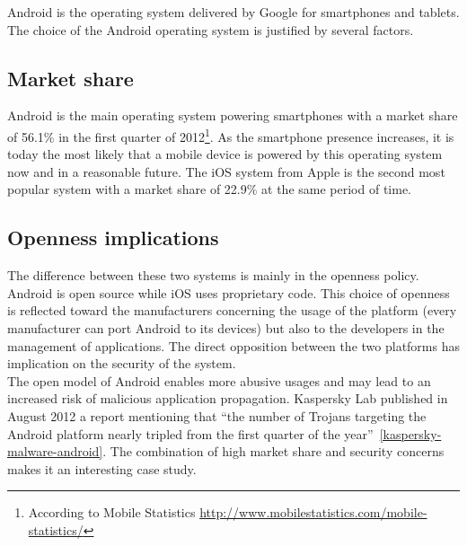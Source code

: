 Android is the operating system delivered by Google for smartphones and tablets.
The choice of the Android operating system is justified by several factors.\\

\subsection*{Market share}

Android is the main operating system powering smartphones with a market share of 56.1\% in the first quarter of 2012\footnote{According to Mobile Statistics \url{http://www.mobilestatistics.com/mobile-statistics/}}.
As the smartphone presence increases, it is today the most likely that a mobile device is powered by this operating system now and in a reasonable future.
The iOS system from Apple is the second most popular system with a market share of 22.9\% at the same period of time.\\

\subsection*{Openness implications}
The difference between these two systems is mainly in the openness policy.
Android is open source while iOS uses proprietary code.
This choice of openness is reflected toward the manufacturers concerning the usage of the platform (every manufacturer can port Android to its devices) but also to the developers in the management of applications.
The direct opposition between the two platforms has implication on the security of the system.\\

The open model of Android enables more abusive usages and may lead to an increased risk of malicious application propagation.
Kaspersky Lab published in August 2012 a report mentioning that ``the number of Trojans targeting the Android platform nearly tripled from the first quarter of the year''~\ref{kaspersky-malware-android}.
The combination of high market share and security concerns makes it an interesting case study.\\

